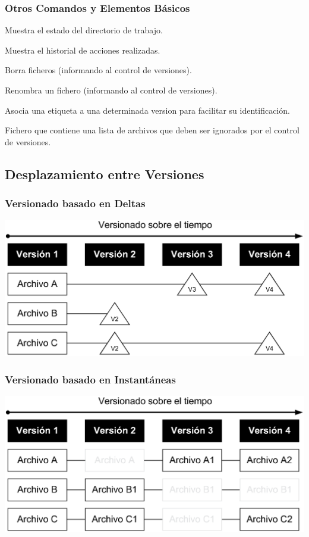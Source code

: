 \documentclass[animated,a4paper,slidestop,xcolor=pst,blue]{beamer}
\begin{document}
\begin{frame}[c]
	\frametitle{Otros Comandos y Elementos Básicos}
	 \begin{description}[<+->]
        \item[status] Muestra el estado del directorio de trabajo.
        \item[log] Muestra el historial de acciones realizadas.
        \item[rm] Borra ficheros (informando al control de versiones).
        \item[mv] Renombra un fichero (informando al control de versiones).
        \item[tag] Asocia una etiqueta a una determinada version para facilitar su identificación.
        \item[.gitignore] Fichero que contiene una lista de archivos que deben ser ignorados por el control de versiones.
	 \end{description}
\end{frame}

\subsection{Desplazamiento entre Versiones}

\begin{frame}[c]
	\frametitle{Versionado basado en Deltas}
	 \begin{center}
		\includegraphics[width=\linewidth,keepaspectratio=true]{images/git/deltas.eps}
	 \end{center}
\end{frame}

\begin{frame}[c]
	\frametitle{Versionado basado en Instantáneas}
	 \begin{center}
		\includegraphics[width=\linewidth,keepaspectratio=true]{images/git/snapshots.eps}
	 \end{center}
\end{frame}
\end{document}
